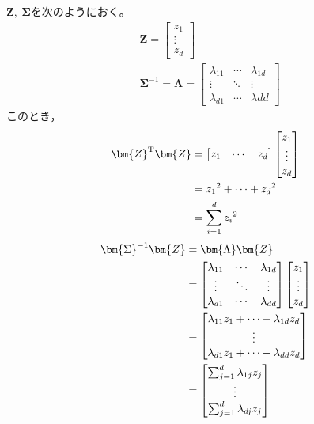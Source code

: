 \documentclass[class=jsarticle, crop=false, dvipdfmx, fleqn]{standalone}
\begin{document}
\(\bm{Z},\ \bm{\Sigma}\)を次のようにおく。
\begin{align}
    & \bm{Z} = \begin{bmatrix} z_1 \\ \vdots \\ z_d \end{bmatrix} \\
    & \bm{\Sigma}^{-1} = \bm{\Lambda} =
        \begin{bmatrix}
            \lambda_{11} & \cdots & \lambda_{1d} \\
            \vdots & \ddots & \vdots \\
            \lambda_{d1} & \cdots & \lambda{dd}
        \end{bmatrix}
\end{align}
このとき，
\begin{align}
    \bm{Z}^\mathrm{T} \bm{Z}
        & =
            \begin{bmatrix} z_1 & \cdots & z_d \end{bmatrix}
            \begin{bmatrix} z_1 \\ \vdots \\ z_d \end{bmatrix} \notag \\
        & = {z_1}^2 + \cdots + {z_d}^2 \notag \\
        & = \sum_{i=1}^{d} {z_i}^2
\end{align}
\begin{align}
    \bm{\Sigma}^{-1} \bm{Z}
        & = \bm{\Lambda} \bm{Z} \notag \\
        & =
            \begin{bmatrix}
                \lambda_{11} & \cdots & \lambda_{1d} \\
                \vdots & \ddots & \vdots \\
                \lambda_{d1} & \cdots & \lambda_{dd}
            \end{bmatrix}
            \begin{bmatrix} z_1 \\ \vdots \\ z_d \end{bmatrix} \notag \\
        & =
            \begin{bmatrix}
                \lambda_{11} z_1 + \cdots + \lambda_{1d} z_d \\
                \vdots \\
                \lambda_{d1} z_1 + \cdots + \lambda_{dd} z_d \\
            \end{bmatrix} \notag \\
        & =
            \begin{bmatrix}
                \sum_{j=1}^{d} \lambda_{1j} z_j \\
                \vdots \\
                \sum_{j=1}^{d} \lambda_{dj} z_j \\
            \end{bmatrix}
\end{align}
\end{document}
